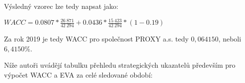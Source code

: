 Výsledný vzorec lze tedy napsat jako:


\begin{center}
$WACC = 0.0807 * \frac{26\ 871}{42\ 294} + 0.0436 * \frac{15\ 423}{42\ 294} * (1 - 0.19)$	
\end{center}

Za rok 2019 je tedy WACC pro společnost PROXY a.s. tedy $0,064150$, neboli $6,4150\%$.\\


\newpage

Níže autoři uvádějí tabulku přehledu strategických ukazatelů především pro výpočet WACC a EVA za celé sledované období:\\

